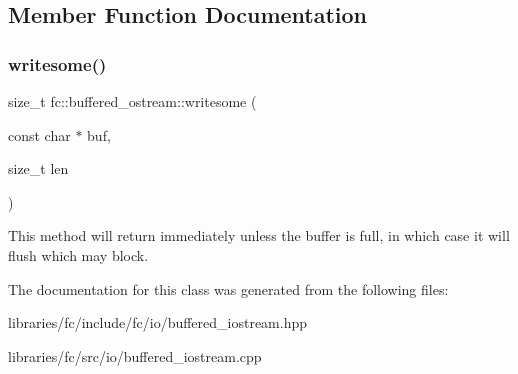 \subsection{Member Function Documentation}
\mbox{\label{classfc_1_1buffered__ostream_a97aa6bcd47b0506a080779840fffd493}} 
\subsubsection{\texorpdfstring{writesome()}{writesome()}}
{\footnotesize\ttfamily size\+\_\+t fc\+::buffered\+\_\+ostream\+::writesome (\begin{DoxyParamCaption}\item[{const char $\ast$}]{buf,  }\item[{size\+\_\+t}]{len }\end{DoxyParamCaption})\hspace{0.3cm}{\ttfamily [virtual]}}

This method will return immediately unless the buffer is full, in which case it will flush which may block. 

The documentation for this class was generated from the following files\+:\begin{DoxyCompactItemize}
\item 
libraries/fc/include/fc/io/buffered\+\_\+iostream.\+hpp\item 
libraries/fc/src/io/buffered\+\_\+iostream.\+cpp\end{DoxyCompactItemize}
